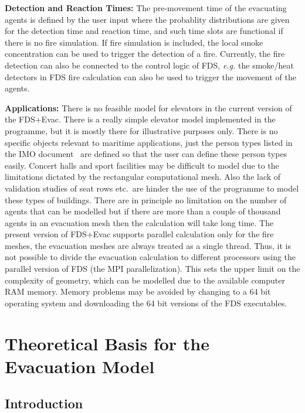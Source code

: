 \documentclass[12pt,a4paper,final,twoside]{stylevk}
\begin{document}
\textbf{Detection and Reaction Times:} The pre-movement time of the evacuating agents is defined by the user input where the probablity distributions are given for the detection time and reaction time, and such time slots are functional if there is no fire simulation.  If fire simulation is included, the local smoke concentration can be used to trigger the detection of a fire.  Currently, the fire detection can
also be connected to the control logic of FDS, \emph{e.g.}  the
smoke/heat detectors in FDS fire calculation can also be used to
trigger the movement of the agents.


\textbf{Applications:} There is no feasible model for elevators in the
current version of the FDS+Evac.  There is a really simple elevator
model implemented in the programme, but it is mostly there for
illustrative purposes only.  There is no specific objects relevant to
maritime applications, just the person types listed in the IMO
document~\cite{IMO07} are defined so that the user can define these
person types easily.  Concert halls and sport facilities may be
difficult to model due to the limitations dictated by the rectangular
computational mesh.  Also the lack of validation studies of seat rows
etc.\ are hinder the use of the programme to model these types of
buildings.  There are in principle no limitation on the number of
agents that can be modelled but if there are more than a couple of
thousand agents in an evacuation mesh then the calculation will take
long time.  The present version of FDS+Evac supports parallel
calculation only for the fire meshes, the evacuation meshes are always
treated as a single thread.  Thus, it is not possible to divide the
evacuation calculation to different processors using the parallel
version of FDS (the MPI parallelization).  This sets the upper limit
on the complexity of geometry, which can be modelled due to the
available computer RAM memory.  Memory problems may be avoided by
changing to a 64 bit operating system and downloading the 64 bit
versions of the FDS executables.

\clearpage

\newpage


\chapter{Theoretical Basis for the Evacuation
  Model}\label{Sec_BasisModel} 


\section{Introduction}
\end{document}
